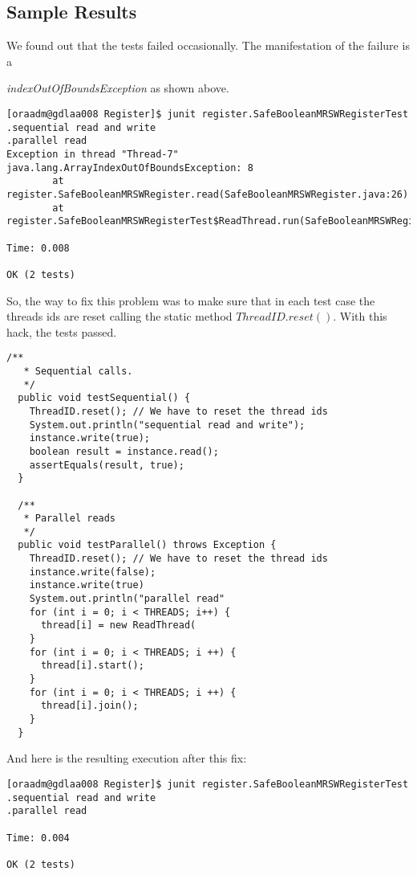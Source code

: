 \subsection{Sample Results}
\par
We found out that the tests failed occasionally. The manifestation of the failure is a 
\par
\textit{indexOutOfBoundsException} as shown above.
\begin{verbatim}
[oraadm@gdlaa008 Register]$ junit register.SafeBooleanMRSWRegisterTest
.sequential read and write
.parallel read
Exception in thread "Thread-7" java.lang.ArrayIndexOutOfBoundsException: 8
        at register.SafeBooleanMRSWRegister.read(SafeBooleanMRSWRegister.java:26)
        at register.SafeBooleanMRSWRegisterTest$ReadThread.run(SafeBooleanMRSWRegisterTest.java:62)

Time: 0.008

OK (2 tests)
\end{verbatim}
\par
So, the way to fix this problem was to make sure that in each test case
the threads ids are reset calling the static method $ThreadID.reset()$. With
this hack, the tests passed.
\par
\begin{lstlisting}[style=numbers]
  /**
   * Sequential calls.
   */
  public void testSequential() {
    ThreadID.reset(); // We have to reset the thread ids
    System.out.println("sequential read and write");
    instance.write(true);
    boolean result = instance.read();
    assertEquals(result, true);
  }

  /**
   * Parallel reads
   */
  public void testParallel() throws Exception {
    ThreadID.reset(); // We have to reset the thread ids
    instance.write(false);
    instance.write(true)
    System.out.println("parallel read"
    for (int i = 0; i < THREADS; i++) {
      thread[i] = new ReadThread(
    }
    for (int i = 0; i < THREADS; i ++) {
      thread[i].start();
    }
    for (int i = 0; i < THREADS; i ++) {
      thread[i].join();
    }
  }  
\end{lstlisting}
\par
And here is the resulting execution after this fix:
\begin{verbatim}
[oraadm@gdlaa008 Register]$ junit register.SafeBooleanMRSWRegisterTest
.sequential read and write
.parallel read

Time: 0.004

OK (2 tests)
\end{verbatim}
\par
